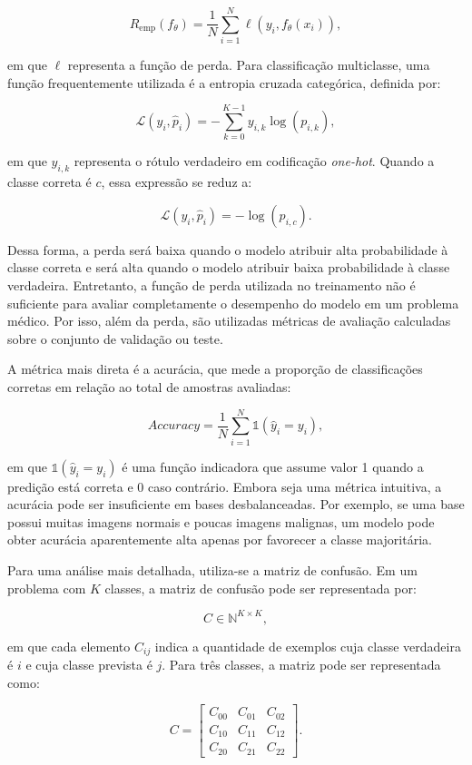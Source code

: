 \documentclass[
    12pt,
    openright,
    oneside,
    a4paper,
    english,
    brazil
]{abntex2}
\begin{document}
\[
R_{\text{emp}}(f_{\theta}) =
\frac{1}{N}
\sum_{i=1}^{N}
\ell(y_i, f_{\theta}(x_i)),
\]

em que \(\ell\) representa a função de perda. Para classificação multiclasse, uma função frequentemente utilizada é a entropia cruzada categórica, definida por:

\[
\mathcal{L}(y_i, \hat{p}_i) =
-\sum_{k=0}^{K-1} y_{i,k}\log(p_{i,k}),
\]

em que \(y_{i,k}\) representa o rótulo verdadeiro em codificação \textit{one-hot}. Quando a classe correta é \(c\), essa expressão se reduz a:

\[
\mathcal{L}(y_i, \hat{p}_i) = -\log(p_{i,c}).
\]

Dessa forma, a perda será baixa quando o modelo atribuir alta probabilidade à classe correta e será alta quando o modelo atribuir baixa probabilidade à classe verdadeira. Entretanto, a função de perda utilizada no treinamento não é suficiente para avaliar completamente o desempenho do modelo em um problema médico. Por isso, além da perda, são utilizadas métricas de avaliação calculadas sobre o conjunto de validação ou teste.

A métrica mais direta é a acurácia, que mede a proporção de classificações corretas em relação ao total de amostras avaliadas:

\[
Accuracy =
\frac{1}{N}
\sum_{i=1}^{N}
\mathbb{1}(\hat{y}_i = y_i),
\]

em que \(\mathbb{1}(\hat{y}_i = y_i)\) é uma função indicadora que assume valor 1 quando a predição está correta e 0 caso contrário. Embora seja uma métrica intuitiva, a acurácia pode ser insuficiente em bases desbalanceadas. Por exemplo, se uma base possui muitas imagens normais e poucas imagens malignas, um modelo pode obter acurácia aparentemente alta apenas por favorecer a classe majoritária.

Para uma análise mais detalhada, utiliza-se a matriz de confusão. Em um problema com \(K\) classes, a matriz de confusão pode ser representada por:

\[
C \in \mathbb{N}^{K \times K},
\]

em que cada elemento \(C_{ij}\) indica a quantidade de exemplos cuja classe verdadeira é \(i\) e cuja classe prevista é \(j\). Para três classes, a matriz pode ser representada como:

\[
C =
\begin{bmatrix}
C_{00} & C_{01} & C_{02} \\
C_{10} & C_{11} & C_{12} \\
C_{20} & C_{21} & C_{22}
\end{bmatrix}.
\]
\end{document}
